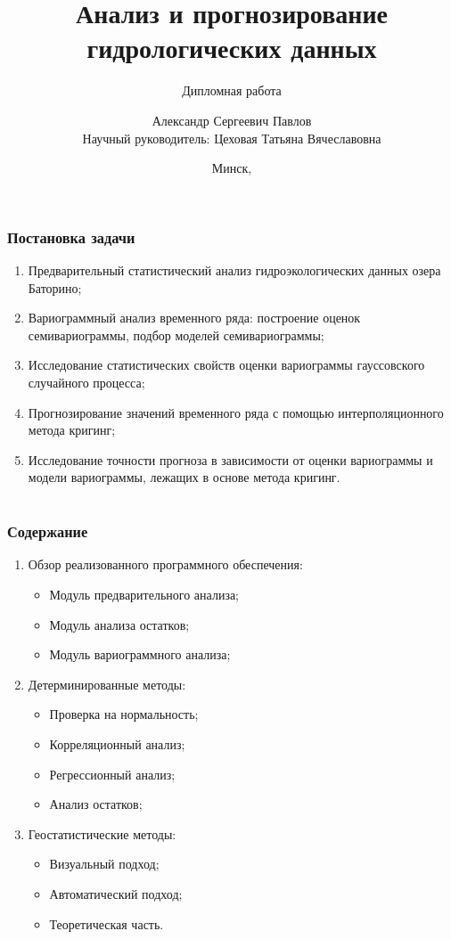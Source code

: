 \documentclass[notheorems]{beamer}
\title[Анализ и прогнозирование гидрологических данных]{Анализ и прогнозирование гидрологических данных}
\subtitle{Дипломная работа}
\author[Павлов А.С.]{Александр Сергеевич Павлов \\ \smallskip Научный руководитель: Цеховая Татьяна Вячеславовна}
\institute[БГУ, ФПМИ]{Факультет прикладной математики и информатики \\ \smallskip Кафедра теории вероятностей и математической статистики}
\date{Минск, \the\year}
\theoremstyle{definition}
\theoremstyle{example}
\theoremstyle{plain}
\begin{document}
\begin{frame}[plain]
  \titlepage
\end{frame}

\begin{frame}
  \frametitle{Постановка задачи}
  \begin{enumerate}
    \item Предварительный статистический анализ гидроэкологических данных озера Баторино;
    \item Вариограммный анализ временного ряда: построение оценок семивариограммы, подбор моделей семивариограммы;
    \item Исследование статистических свойств оценки вариограммы гауссовского случайного процесса;
    \item Прогнозирование значений временного ряда с помощью интерполяционного метода кригинг;
    \item Исследование точности прогноза в зависимости от оценки вариограммы и модели вариограммы, лежащих в основе метода кригинг.
  \end{enumerate}
\end{frame}

\section[Содержание]{}
\begin{frame}
  \frametitle{Содержание}
  \begin{enumerate}
    \item Обзор реализованного программного обеспечения:
      \begin{itemize}
        \item Модуль предварительного анализа;
        \item Модуль анализа остатков;
        \item Модуль вариограммного анализа;
      \end{itemize}
    \item Детерминированные методы:
      \begin{itemize}
        \item Проверка на нормальность;
        \item Корреляционный анализ;
        \item Регрессионный анализ;
        \item Анализ остатков;
      \end{itemize}
    \item Геостатистические методы:
      \begin{itemize}
        \item Визуальный подход;
        \item Автоматический подход;
        \item Теоретическая часть.
      \end{itemize}
  \end{enumerate}
\end{frame}
\end{document}
